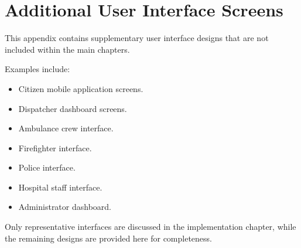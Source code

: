 \chapter{Additional User Interface Screens}
\label{appendix:ui}

This appendix contains supplementary user interface designs that are not included within the main chapters.

Examples include:

\begin{itemize}
    \item Citizen mobile application screens.
    \item Dispatcher dashboard screens.
    \item Ambulance crew interface.
    \item Firefighter interface.
    \item Police interface.
    \item Hospital staff interface.
    \item Administrator dashboard.
\end{itemize}

Only representative interfaces are discussed in the implementation chapter, while the remaining designs are provided here for completeness.